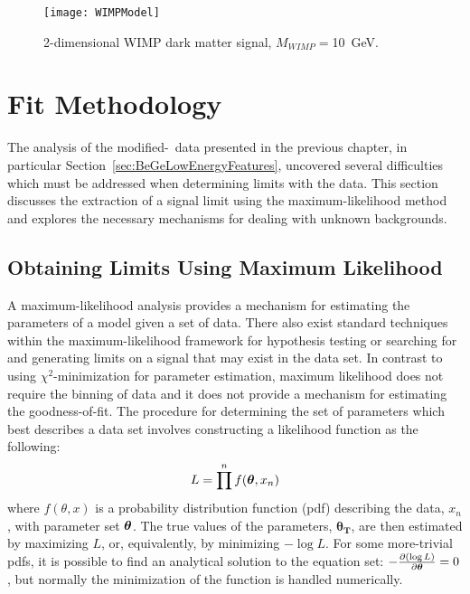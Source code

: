 		\begin{figure}
			\centering
			\texttt{[image: WIMPModel]}
			\caption[2-dimensional WIMP dark matter signal]
			{2-dimensional WIMP dark matter signal, $M_{WIMP} = $10~GeV.}
			\label{fig:2DDMSignal}
		\end{figure}


\section{Fit Methodology} 

	The analysis of the modified-\bege~data presented in the previous chapter, in particular Section~\ref{sec:BeGeLowEnergyFeatures}, uncovered several difficulties which must be addressed when determining limits with the data.  This section discusses the extraction of a signal limit using the maximum-likelihood method and explores the necessary mechanisms for dealing with unknown backgrounds.  
	
	\subsection{Obtaining Limits Using Maximum Likelihood}
	\label{sec:LimitsML}		

A maximum-likelihood analysis provides a mechanism for estimating the parameters of a model given a set of data.  There also exist standard techniques within the maximum-likelihood framework for hypothesis testing or searching for and generating limits on a signal that may exist in the data set.  In contrast to using $\chi^{2}$-minimization for parameter estimation, maximum likelihood does not require the binning of data
 and it does not provide a mechanism for estimating the goodness-of-fit.  The procedure for determining the set of parameters which best describes a data set involves constructing a likelihood function as the following:
		\begin{equation}
		L = \prod^{n} f({\boldsymbol{\theta}}, x_{n})
		\label{eqn:loglikelihood}
		\end{equation}
where $f(\theta, x)$ is a probability distribution function (pdf) describing the data, $x_{n}$, with parameter set $\boldsymbol{\theta}$.  The true values of the parameters, $\boldsymbol{\theta_{T}}$, are then estimated by maximizing $L$, or, equivalently, by minimizing $-\log L$.  For some more-trivial pdfs, it is possible to find an analytical solution to the equation set: $-\frac{\partial ( \log L )}{\partial\boldsymbol{\theta}} = 0$, but normally the minimization of the function is handled numerically.  

